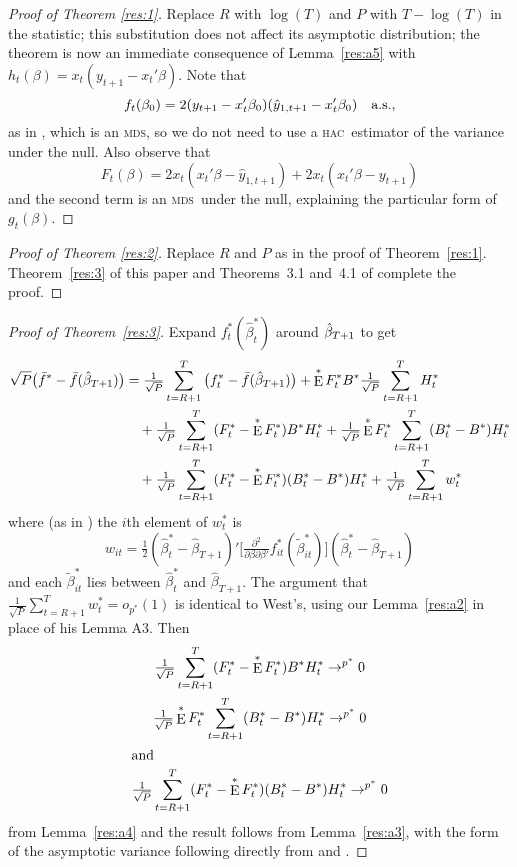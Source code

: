 \documentclass[11pt,fleqn]{article}
\theoremstyle{definition}
\DeclareMathOperator{\E}{E}
\newcommand{\btrue}[1][]{\if#1*\hat\beta_{T+1}\else\beta_0\fi}
\newcommand{\osum}[1]{\sum_{#1=R+1}^T}
\newcommand{\oclt}[1]{\tfrac{1}{\sqrt{P}} \osum{#1}}
\newcommand{\hac}{\textsc{hac}}
\newcommand{\mds}{\textsc{mds}}
\begin{document}
\begin{proof}[Proof of Theorem \ref{res:1}]
  Replace $R$ with $\log(T)$ and $P$ with $T - \log(T)$ in the
  statistic; this substitution does not affect its asymptotic
  distribution; the theorem is now an immediate consequence of
  Lemma~\ref{res:a5} with $h_t(\beta) = x_t (y_{t+1} - x_t'\beta)$.
  Note that \[f_t(\btrue)= 2 (y_{t+1} -
  x_t'\btrue)(\hat{y}_{1,t+1} - x_t'\btrue) \quad \text{a.s.},\] as
  in \citet{ClW:07}, which is an \mds, so we do not need to use a
  \hac\ estimator of the variance under the null.  Also observe that
  \[F_t(\beta) = 2 x_t(x_t'\beta - \hat y_{1,t+1}) + 2 x_t(x_t'\beta -
  y_{t+1})\] and the second term is an \mds\ under the null,
  explaining the particular form of $g_t(\beta)$.
\end{proof}

\begin{proof}[Proof of Theorem \ref{res:2}]
  Replace $R$ and $P$ as in the proof of Theorem~\ref{res:1}.
  Theorem~\ref{res:3} of this paper and Theorems~3.1 and~4.1 of
  \citet{RoW:05} complete the proof.
\end{proof}

\newcommand{\WesA}[1][]{\oclt{t}
  (F_t^{#1} - \E^{#1} F_t^{#1}) B^{#1} H_t^{#1}}
\newcommand{\WesB}[1][]{\tfrac{1}{\sqrt{P}} \E^{#1} F_t^{#1} \osum{t} (B_t^{#1} -
  B^{#1}) H_t^{#1}}
\newcommand{\WesC}[1][]{\oclt{t}
  (F_t^{#1} - \E^{#1} F_t^{#1}) (B_t^{#1} - B^{#1}) H_t^{#1}}
\begin{proof}[Proof of Theorem~\ref{res:3}]
  Expand $f_t^{*}(\hat{\beta}_t^{*})$ around $\btrue[*]$
  to get
  \begin{align*}
    \sqrt{P} \big(\bar{f}^{*} - \bar{f}(\btrue[*])\big) &= \oclt{t}
    \big(f_t^{*} - \bar{f}(\btrue[*])\big) +
    \E^* F_t^{*} B^{*} \oclt{t} H_t^* \\
    & \quad + \WesA[*] + \WesB[*] \\ & \quad + \WesC[*] + \oclt{t} w_t^*
  \end{align*}
  where (as in \citealp{Wes:96}) the $i$th element of $w_t^*$ is
  \begin{equation*}
    w_{it} = \tfrac12 (\hat\beta_t^* - \hat\beta_{T+1})'
    \Big[\tfrac{\partial^2}{\partial \beta \partial\beta'} 
    f_{it}^*(\tilde\beta_{it}^*) \Big]
    (\hat\beta_t^* - \hat\beta_{T+1})
  \end{equation*}
  and each $\tilde\beta_{it}^*$ lies between $\hat\beta_t^*$ and
  $\hat\beta_{T+1}$.  The argument that $\oclt{t} w_t^* = o_{p^*}(1)$ is
  identical to West's, using our Lemma~\ref{res:a2} in place of his
  Lemma A3.  Then
  \begin{gather}
    \WesA[*] \to^{p^*} 0 \label{eq:7} \\
    \WesB[*] \to^{p^*} 0 \label{eq:9} \\
  \intertext{and}
    \WesC[*] \to^{p^*} 0 \label{eq:10}
  \end{gather}
  from Lemma~\ref{res:a4} and the result follows from
  Lemma~\ref{res:a3}, with the form of the asymptotic variance
  following directly from \citet{Wes:96} and \citet{WeM:98}.
\end{proof}
\end{document}
